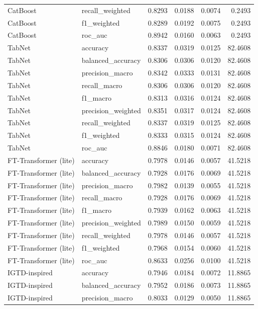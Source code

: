 \begin{tabular}{llrrrr}
CatBoost & recall_weighted & 0.8293 & 0.0188 & 0.0074 & 0.2493 \\
CatBoost & f1_weighted & 0.8289 & 0.0192 & 0.0075 & 0.2493 \\
CatBoost & roc_auc & 0.8942 & 0.0160 & 0.0063 & 0.2493 \\
TabNet & accuracy & 0.8337 & 0.0319 & 0.0125 & 82.4608 \\
TabNet & balanced_accuracy & 0.8306 & 0.0306 & 0.0120 & 82.4608 \\
TabNet & precision_macro & 0.8342 & 0.0333 & 0.0131 & 82.4608 \\
TabNet & recall_macro & 0.8306 & 0.0306 & 0.0120 & 82.4608 \\
TabNet & f1_macro & 0.8313 & 0.0316 & 0.0124 & 82.4608 \\
TabNet & precision_weighted & 0.8351 & 0.0317 & 0.0124 & 82.4608 \\
TabNet & recall_weighted & 0.8337 & 0.0319 & 0.0125 & 82.4608 \\
TabNet & f1_weighted & 0.8333 & 0.0315 & 0.0124 & 82.4608 \\
TabNet & roc_auc & 0.8846 & 0.0180 & 0.0071 & 82.4608 \\
FT-Transformer (lite) & accuracy & 0.7978 & 0.0146 & 0.0057 & 41.5218 \\
FT-Transformer (lite) & balanced_accuracy & 0.7928 & 0.0176 & 0.0069 & 41.5218 \\
FT-Transformer (lite) & precision_macro & 0.7982 & 0.0139 & 0.0055 & 41.5218 \\
FT-Transformer (lite) & recall_macro & 0.7928 & 0.0176 & 0.0069 & 41.5218 \\
FT-Transformer (lite) & f1_macro & 0.7939 & 0.0162 & 0.0063 & 41.5218 \\
FT-Transformer (lite) & precision_weighted & 0.7989 & 0.0150 & 0.0059 & 41.5218 \\
FT-Transformer (lite) & recall_weighted & 0.7978 & 0.0146 & 0.0057 & 41.5218 \\
FT-Transformer (lite) & f1_weighted & 0.7968 & 0.0154 & 0.0060 & 41.5218 \\
FT-Transformer (lite) & roc_auc & 0.8633 & 0.0256 & 0.0100 & 41.5218 \\
IGTD-inspired & accuracy & 0.7946 & 0.0184 & 0.0072 & 11.8865 \\
IGTD-inspired & balanced_accuracy & 0.7952 & 0.0186 & 0.0073 & 11.8865 \\
IGTD-inspired & precision_macro & 0.8033 & 0.0129 & 0.0050 & 11.8865 \\

\end{tabular}
